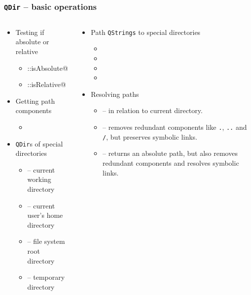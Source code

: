 \begin{frame}[fragile]
  \frametitle{\texttt{QDir} -- basic operations}
  \footnotesize
  \begin{columns}
    \begin{column}{0.45\textwidth}
    \begin{itemize}
      \item Testing if absolute or relative
      \begin{itemize}
      \item \verb@QDir::isAbsolute@
      \item \verb@QDir::isRelative@
      \end{itemize}
      \item Getting path components
      \begin{itemize}
        \item \verb@dirName@
      \end{itemize}
      \item \texttt{QDir}s of special directories
      \begin{itemize}
        \item \verb@current@ -- current working directory
        \item \verb@home@ -- current user's home directory
        \item \verb@root@ -- file system root directory
        \item \verb@temp@ -- temporary directory
      \end{itemize}
    \end{itemize}
    \end{column}
    \begin{column}{0.55\textwidth}
    \begin{itemize}
      \item Path \texttt{QStrings} to special directories
      \begin{itemize}
        \item \verb@currentPath@
        \item \verb@homePath@
        \item \verb@rootPath@
        \item \verb@tempPath@
      \end{itemize}
      \item Resolving paths
      \begin{itemize}
        \item \verb@absolutePath@ -- in relation to current directory.
        \item \verb@cleanPath@ -- removes redundant components like  \texttt{.},
          \texttt{..} and \texttt{/}, but preserves symbolic links.
        \item \verb@canonicalPath@ -- returns an absolute path, but also removes
          redundant components and resolves symbolic links.
      \end{itemize}
    \end{itemize}
    \end{column}
  \end{columns}
\end{frame}

